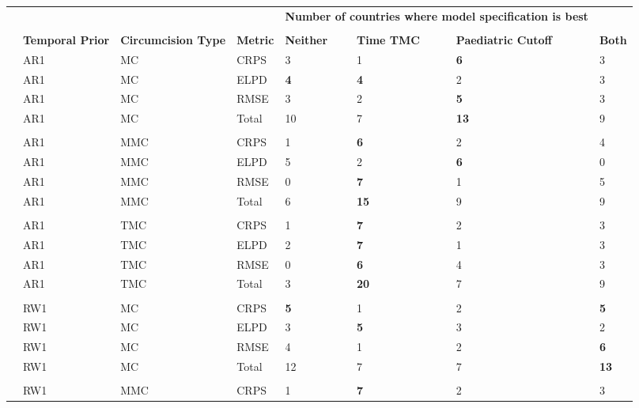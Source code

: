 \documentclass{article}
\begin{document}
{\linespread{1}
  \footnotesize 
\begin{longtable}[c]{llllllll}
        \hline
        & & & & \multicolumn{3}{c}{\bf Number of countries where model specification is best}\\
        \cmidrule{5-8} \\
        & {\bf Temporal Prior} & {\bf Circumcision Type} & {\bf Metric}  & {\bf Neither} & {\bf Time TMC} & {\bf Paediatric Cutoff} & {\bf Both} \\[5pt]
        \midrule
        & AR1 & MC & CRPS & 3 & 1 & \bf{6} & 3 \\ 
        & AR1 & MC & ELPD & \bf{4} & \bf{4} & 2 & 3 \\ 
        & AR1 & MC & RMSE & 3 & 2 & \bf{5} & 3 \\ 
        \hline 
        & AR1 & MC & Total & 10 & 7 & \bf{13} & 9 \\ 
        \hline \\ 
        & AR1 & MMC & CRPS & 1 & \bf{6} & 2 & 4 \\ 
        & AR1 & MMC & ELPD & 5 & 2 & \bf{6} & 0 \\ 
        & AR1 & MMC & RMSE & 0 & \bf{7} & 1 & 5 \\ 
        \hline 
        & AR1 & MMC & Total & 6 & \bf{15} & 9 & 9 \\ 
        \hline \\ 
        & AR1 & TMC & CRPS & 1 & \bf{7} & 2 & 3 \\ 
        & AR1 & TMC & ELPD & 2 & \bf{7} & 1 & 3 \\ 
        & AR1 & TMC & RMSE & 0 & \bf{6} & 4 & 3 \\ 
        \hline 
        & AR1 & TMC & Total & 3 & \bf{20} & 7 & 9 \\ 
        \hline \\ 
        & RW1 & MC & CRPS & \bf{5} & 1 & 2 & \bf{5} \\ 
        & RW1 & MC & ELPD & 3 & \bf{5} & 3 & 2 \\ 
        & RW1 & MC & RMSE & 4 & 1 & 2 & \bf{6} \\ 
        \hline 
        & RW1 & MC & Total & 12 & 7 & 7 & \bf{13} \\ 
        \hline \\ 
        & RW1 & MMC & CRPS & 1 & \bf{7} & 2 & 3 \\ 

\end{longtable}}
\end{document}
